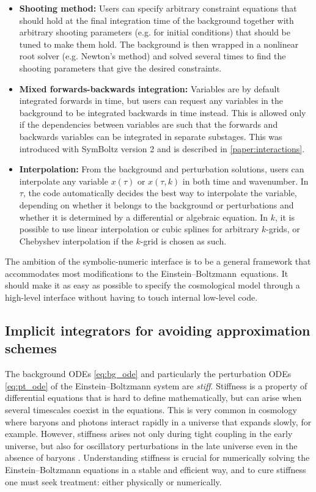 \documentclass[USenglish, thumbmarks]{uiophdthesis} %
\newcommand\EB{Einstein--Boltzmann}
\begin{document}
\begin{itemize}
and the constraint equation is then used to solve for the initial value of $\phi$.
\item \textbf{Shooting method:}
Users can specify arbitrary constraint equations that should hold at the final integration time of the background
together with arbitrary shooting parameters (e.g. for initial conditions) that should be tuned to make them hold.
The background is then wrapped in a nonlinear root solver (e.g. Newton's method)
and solved several times to find the shooting parameters that give the desired constraints.
\item \textbf{Mixed forwards-backwards integration:}
Variables are by default integrated forwards in time,
but users can request any variables in the background to be integrated backwards in time instead.
This is allowed only if the dependencies between variables are such that
the forwards and backwards variables can be integrated in separate substages.
This was introduced with SymBoltz version 2 and is described in \cref{paper:interactions}.
\item \textbf{Interpolation:}
From the background and perturbation solutions,
users can interpolate any variable $x(\tau)$ or $x(\tau,k)$ in both time and wavenumber.
In $\tau$, the code automatically decides the best way to interpolate the variable,
depending on whether it belongs to the background or perturbations
and whether it is determined by a differential or algebraic equation.
In $k$, it is possible to use linear interpolation or cubic splines for arbitrary $k$-grids,
or Chebyshev interpolation if the $k$-grid is chosen as such.
\end{itemize}
The ambition of the symbolic-numeric interface is to be a general framework
that accommodates most modifications to the \EB{} equations.
It should make it as easy as possible to specify the cosmological model
through a high-level interface without having to touch internal low-level code.

\subsection{Implicit integrators for avoiding approximation schemes}
\label{sec:approx}

The background ODEs \eqref{eq:bg_ode} and particularly the perturbation ODEs \eqref{eq:pt_ode} of the \EB{} system are \emph{stiff}.
Stiffness is a property of differential equations that is hard to define mathematically,
but can arise when several timescales coexist in the equations.
This is very common in cosmology where baryons and photons interact rapidly in a universe that expands slowly, for example.
However, stiffness arises not only during tight coupling in the early universe,
but also for oscillatory perturbations in the late universe even in the absence of baryons
\cite{nadkarni-ghoshEinsteinBoltzmannEquationsRevisited2017a}.
Understanding stiffness is crucial for numerically solving the \EB{} equations in a stable and efficient way,
and to cure stiffness one must seek treatment: either physically or numerically.
\end{document}
